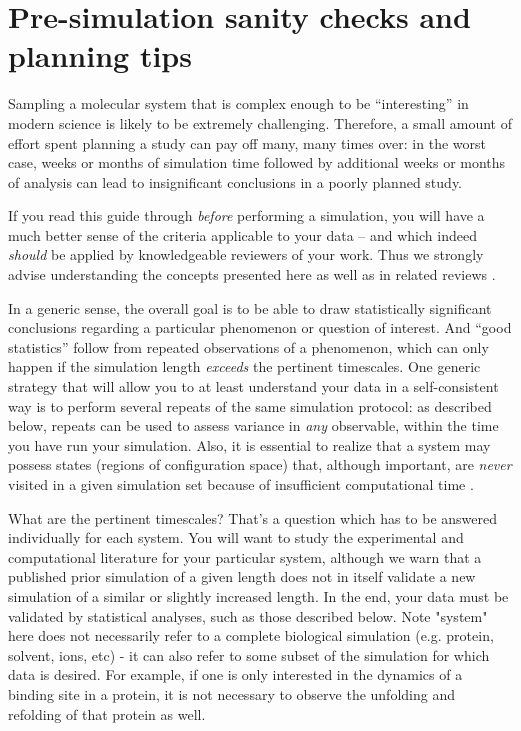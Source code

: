 \section{Pre-simulation sanity checks and planning tips}
\label{sec:sanity}

Sampling a molecular system that is complex enough to be ``interesting'' in modern science is likely to be extremely challenging.
Therefore, a small amount of effort spent planning a study can pay off many, many times over: in the worst case, weeks or months of simulation time followed by additional weeks or months of analysis can lead to insignificant conclusions in a poorly planned study.

If you read this guide through \emph{before} performing a simulation, you will have a much better sense of the criteria applicable to your data -- and which indeed \emph{should} be applied by knowledgeable reviewers of your work.
Thus we strongly advise understanding the concepts presented here as well as in related reviews \cite{Grossfield2009,JCGM:GUM2008}.

In a generic sense, the overall goal is to be able to draw statistically significant conclusions regarding a particular phenomenon or question of interest.
And ``good statistics'' follow from repeated observations of a phenomenon, which can only happen if the simulation length \emph{exceeds} the pertinent timescales.
One generic strategy that will allow you to at least understand your data in a self-consistent way is to perform several repeats of the same simulation protocol: as described below, repeats can be used to assess variance in \emph{any} observable, within the time you have run your simulation.
Also, it is essential to realize that a system may possess states (regions of configuration space) that, although important, are \emph{never} visited in a given simulation set because of insufficient computational time \cite{Grossfield2009}.

What are the pertinent timescales?
That's a question which has to be answered individually for each system.
You will want to study the experimental and computational literature for your particular system, although we warn that a published prior simulation of a given length does not in itself validate a new simulation of a similar or slightly increased length.
In the end, your data must be validated by statistical analyses, such as those described below. Note "system" here does not necessarily refer to a complete biological simulation (e.g. protein, solvent, ions, etc) - it can also refer to some subset of the simulation for which data is desired. For example, if one is only interested in the dynamics of a binding site in a protein, it is not necessary to observe the unfolding and refolding of that protein as well.

